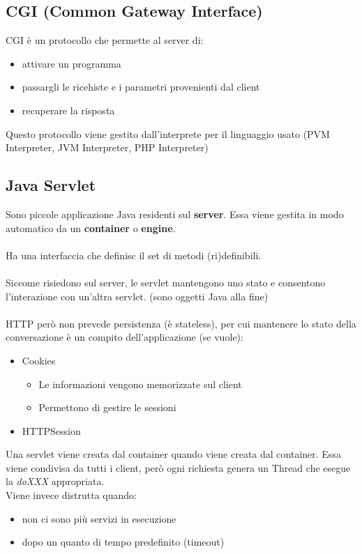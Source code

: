 \documentclass[12pt, a4paper]{article}
\begin{document}
    \subsection*{CGI (Common Gateway Interface)}
    CGI è un protocollo che permette al server di:
    \begin{itemize}
        \item attivare un programma
        \item passargli le ricehiste e i parametri provenienti dal client
        \item recuperare la risposta
    \end{itemize}
    Questo protocollo viene gestito dall'interprete per il linguaggio usato (PVM Interpreter, JVM Interpreter, PHP Interpreter)

    \subsection{Java Servlet}
    Sono piccole applicazione Java residenti sul \textbf{server}. Essa viene gestita in modo automatico
    da un \textbf{container} o \textbf{engine}.
    \\\\Ha una interfaccia che definisc il set di metodi (ri)definibili.
    \\\\Siccome risiedono sul server, le servlet mantengono uno stato e consentono
    l'interazione con un'altra servlet. (sono oggetti Java alla fine)
    \\\\HTTP però non prevede persistenza (è stateless), per cui mantenere lo stato della conversazione
    è un compito dell'applicazione (se vuole):
    \begin{itemize}
        \item Cookies
        \begin{itemize}
            \item Le informazioni vengono memorizzate sul client
            \item Permettono di gestire le sessioni
        \end{itemize}
        \item HTTPSession
    \end{itemize}
    Una servlet viene creata dal container quando viene creata dal container.
    Essa viene condivisa da tutti i client, però ogni richiesta genera un Thread 
    che esegue la \textit{doXXX} appropriata.
    \\Viene invece distrutta quando:
    \begin{itemize}
        \item non ci sono più servizi in esecuzione
        \item dopo un quanto di tempo predefinito (timeout)
    \end{itemize}
\end{document}
